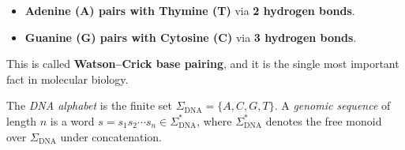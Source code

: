 \begin{itemize}[leftmargin=1.8em]
  \item \textbf{Adenine (A) pairs with Thymine (T)} via \textbf{2 hydrogen bonds}.
  \item \textbf{Guanine (G) pairs with Cytosine (C)} via \textbf{3 hydrogen bonds}.
\end{itemize}

This is called \textbf{Watson--Crick base pairing}, and it is the single most important fact in molecular biology.

\begin{dogmadef}
The \emph{DNA alphabet} is the finite set $\Sigma_{\mathrm{DNA}} = \{A, C, G, T\}$. A \emph{genomic sequence} of length $n$ is a word $s = s_1 s_2 \cdots s_n \in \Sigma_{\mathrm{DNA}}^*$, where $\Sigma_{\mathrm{DNA}}^*$ denotes the free monoid over $\Sigma_{\mathrm{DNA}}$ under concatenation.
\end{dogmadef}

